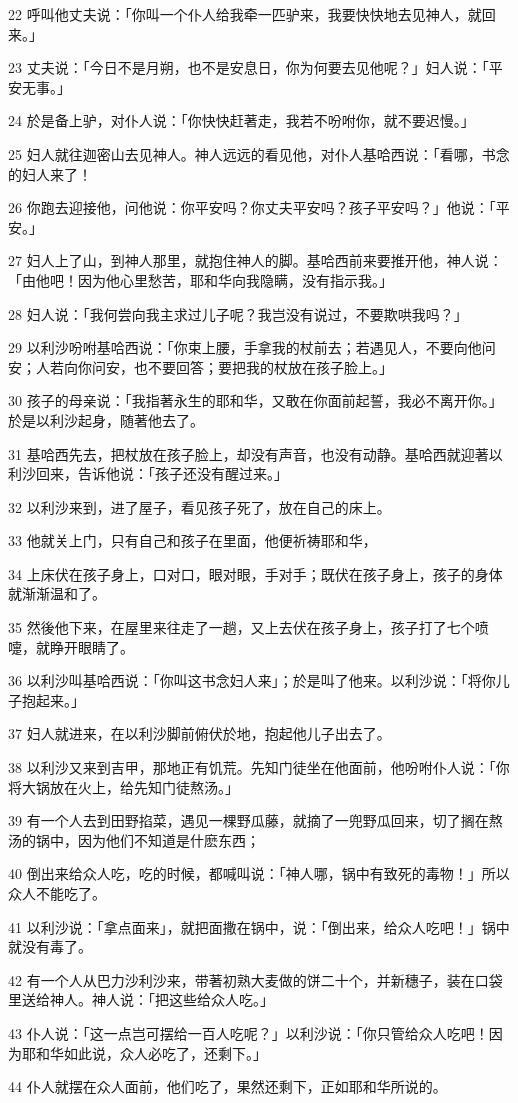 \par 22 呼叫他丈夫说：「你叫一个仆人给我牵一匹驴来，我要快快地去见神人，就回来。」
\par 23 丈夫说：「今日不是月朔，也不是安息日，你为何要去见他呢？」妇人说：「平安无事。」
\par 24 於是备上驴，对仆人说：「你快快赶著走，我若不吩咐你，就不要迟慢。」
\par 25 妇人就往迦密山去见神人。神人远远的看见他，对仆人基哈西说：「看哪，书念的妇人来了！
\par 26 你跑去迎接他，问他说：你平安吗？你丈夫平安吗？孩子平安吗？」他说：「平安。」
\par 27 妇人上了山，到神人那里，就抱住神人的脚。基哈西前来要推开他，神人说：「由他吧！因为他心里愁苦，耶和华向我隐瞒，没有指示我。」
\par 28 妇人说：「我何尝向我主求过儿子呢？我岂没有说过，不要欺哄我吗？」
\par 29 以利沙吩咐基哈西说：「你束上腰，手拿我的杖前去；若遇见人，不要向他问安；人若向你问安，也不要回答；要把我的杖放在孩子脸上。」
\par 30 孩子的母亲说：「我指著永生的耶和华，又敢在你面前起誓，我必不离开你。」於是以利沙起身，随著他去了。
\par 31 基哈西先去，把杖放在孩子脸上，却没有声音，也没有动静。基哈西就迎著以利沙回来，告诉他说：「孩子还没有醒过来。」
\par 32 以利沙来到，进了屋子，看见孩子死了，放在自己的床上。
\par 33 他就关上门，只有自己和孩子在里面，他便祈祷耶和华，
\par 34 上床伏在孩子身上，口对口，眼对眼，手对手；既伏在孩子身上，孩子的身体就渐渐温和了。
\par 35 然後他下来，在屋里来往走了一趟，又上去伏在孩子身上，孩子打了七个喷嚏，就睁开眼睛了。
\par 36 以利沙叫基哈西说：「你叫这书念妇人来」；於是叫了他来。以利沙说：「将你儿子抱起来。」
\par 37 妇人就进来，在以利沙脚前俯伏於地，抱起他儿子出去了。
\par 38 以利沙又来到吉甲，那地正有饥荒。先知门徒坐在他面前，他吩咐仆人说：「你将大锅放在火上，给先知门徒熬汤。」
\par 39 有一个人去到田野掐菜，遇见一棵野瓜藤，就摘了一兜野瓜回来，切了搁在熬汤的锅中，因为他们不知道是什麽东西；
\par 40 倒出来给众人吃，吃的时候，都喊叫说：「神人哪，锅中有致死的毒物！」所以众人不能吃了。
\par 41 以利沙说：「拿点面来」，就把面撒在锅中，说：「倒出来，给众人吃吧！」锅中就没有毒了。
\par 42 有一个人从巴力沙利沙来，带著初熟大麦做的饼二十个，并新穗子，装在口袋里送给神人。神人说：「把这些给众人吃。」
\par 43 仆人说：「这一点岂可摆给一百人吃呢？」以利沙说：「你只管给众人吃吧！因为耶和华如此说，众人必吃了，还剩下。」
\par 44 仆人就摆在众人面前，他们吃了，果然还剩下，正如耶和华所说的。

